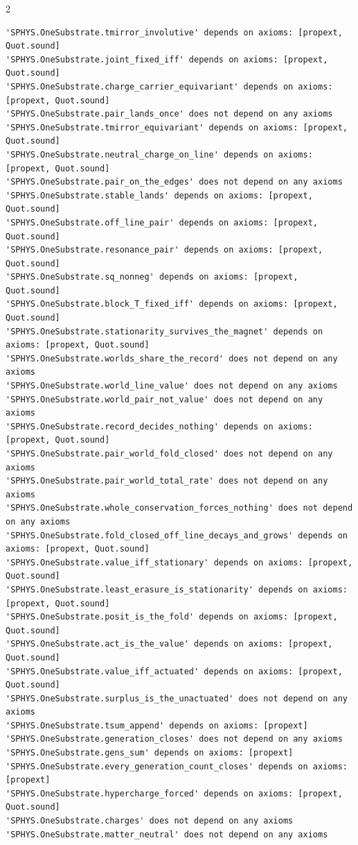 \documentclass[10pt]{article}
\begin{document}
\begin{multicols}{2}
\begin{Verbatim}[fontsize=\fontsize{6.2}{7.2}\selectfont,breaklines,breakanywhere,breaksymbolleft={}]
'SPHYS.OneSubstrate.tmirror_involutive' depends on axioms: [propext, Quot.sound]
'SPHYS.OneSubstrate.joint_fixed_iff' depends on axioms: [propext, Quot.sound]
'SPHYS.OneSubstrate.charge_carrier_equivariant' depends on axioms: [propext, Quot.sound]
'SPHYS.OneSubstrate.pair_lands_once' does not depend on any axioms
'SPHYS.OneSubstrate.tmirror_equivariant' depends on axioms: [propext, Quot.sound]
'SPHYS.OneSubstrate.neutral_charge_on_line' depends on axioms: [propext, Quot.sound]
'SPHYS.OneSubstrate.pair_on_the_edges' does not depend on any axioms
'SPHYS.OneSubstrate.stable_lands' depends on axioms: [propext, Quot.sound]
'SPHYS.OneSubstrate.off_line_pair' depends on axioms: [propext, Quot.sound]
'SPHYS.OneSubstrate.resonance_pair' depends on axioms: [propext, Quot.sound]
'SPHYS.OneSubstrate.sq_nonneg' depends on axioms: [propext, Quot.sound]
'SPHYS.OneSubstrate.block_T_fixed_iff' depends on axioms: [propext, Quot.sound]
'SPHYS.OneSubstrate.stationarity_survives_the_magnet' depends on axioms: [propext, Quot.sound]
'SPHYS.OneSubstrate.worlds_share_the_record' does not depend on any axioms
'SPHYS.OneSubstrate.world_line_value' does not depend on any axioms
'SPHYS.OneSubstrate.world_pair_not_value' does not depend on any axioms
'SPHYS.OneSubstrate.record_decides_nothing' depends on axioms: [propext, Quot.sound]
'SPHYS.OneSubstrate.pair_world_fold_closed' does not depend on any axioms
'SPHYS.OneSubstrate.pair_world_total_rate' does not depend on any axioms
'SPHYS.OneSubstrate.whole_conservation_forces_nothing' does not depend on any axioms
'SPHYS.OneSubstrate.fold_closed_off_line_decays_and_grows' depends on axioms: [propext, Quot.sound]
'SPHYS.OneSubstrate.value_iff_stationary' depends on axioms: [propext, Quot.sound]
'SPHYS.OneSubstrate.least_erasure_is_stationarity' depends on axioms: [propext, Quot.sound]
'SPHYS.OneSubstrate.posit_is_the_fold' depends on axioms: [propext, Quot.sound]
'SPHYS.OneSubstrate.act_is_the_value' depends on axioms: [propext, Quot.sound]
'SPHYS.OneSubstrate.value_iff_actuated' depends on axioms: [propext, Quot.sound]
'SPHYS.OneSubstrate.surplus_is_the_unactuated' does not depend on any axioms
'SPHYS.OneSubstrate.tsum_append' depends on axioms: [propext]
'SPHYS.OneSubstrate.generation_closes' does not depend on any axioms
'SPHYS.OneSubstrate.gens_sum' depends on axioms: [propext]
'SPHYS.OneSubstrate.every_generation_count_closes' depends on axioms: [propext]
'SPHYS.OneSubstrate.hypercharge_forced' depends on axioms: [propext, Quot.sound]
'SPHYS.OneSubstrate.charges' does not depend on any axioms
'SPHYS.OneSubstrate.matter_neutral' does not depend on any axioms

\end{Verbatim}
\end{multicols}
\end{document}
